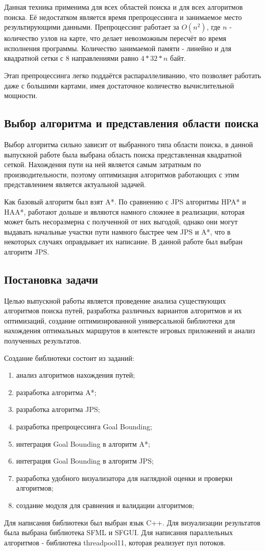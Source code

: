 Данная техника применима для всех областей поиска и для всех алгоритмов поиска. Её недостатком является время препроцессинга и занимаемое место результирующими данными. Препроцессинг работает за $O(n^2)$, где $n$ - количество узлов на карте, что делает невозможным пересчёт во время исполнения программы. Количество занимаемой памяти - линейно и для квадратной сетки с 8 направлениями равно $ 4 * 32 * n$ байт.

Этап препроцессинга легко поддаётся распараллеливанию, что позволяет работать даже с большими картами, имея достаточное количество вычислительной мощности.  

\subsection{Выбор алгоритма и представления области поиска}

Выбор алгоритма сильно зависит от выбранного типа области поиска, в данной выпускной работе была выбрана область поиска представленная квадратной сеткой. Нахождения пути на ней является самым затратным по производительности, поэтому оптимизация алгоритмов работающих с этим представлением является актуальной задачей. 

Как базовый алгоритм был взят A*. По сравнению с JPS алгоритмы HPA* и HAA*, работают дольше и являются намного сложнее в реализации, которая может быть несоразмерна с полученной от них выгодой, однако они могут выдавать начальные участки пути намного быстрее чем JPS и A*, что в некоторых случаях оправдывает их написание. В данной работе был выбран алгоритм JPS.  


\subsection{Постановка задачи}

Целью выпускной работы является проведение анализа существующих алгоритмов поиска путей, разработка различных вариантов алгоритмов и их оптимизаций, создание оптимизированной универсальной библиотеки для нахождения оптимальных маршрутов в контексте игровых приложений и анализ полученных результатов. 

Создание библиотеки состоит из заданий:

\begin{enumerate}
    \item анализ алгоритмов нахождения путей;
    \item разработка алгоритма A*;
    \item разработка алгоритма JPS;
    \item разработка препроцессинга Goal Bounding;
    \item интеграция Goal Bounding в алгоритм A*;
    \item интеграция Goal Bounding в алгоритм JPS;
    \item разработка удобного визуализатора для наглядной оценки и проверки алгоритмов;
    \item создание модуля для сравнения и валидации алгоритмов;
\end{enumerate}

Для написания библиотеки был выбран язык C++. Для визуализации результатов была выбрана библиотека SFML и SFGUI. Для написания параллельных алгоритмов - библиотека threadpool11, которая реализует пул потоков.